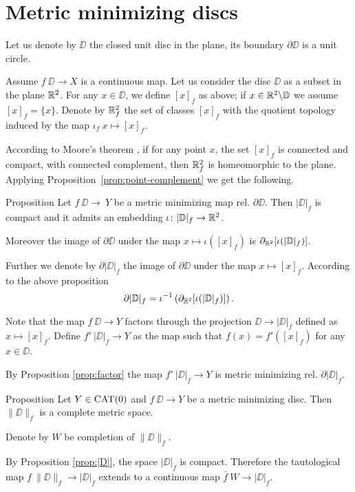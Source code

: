 \documentclass[a4paper,10pt]{amsart}
\begin{document}
\section{Metric minimizing discs}



Let us denote by $\DD$ the closed unit disc in the plane,
its boundary $\partial \DD$ is a unit circle.

Assume $f\:\DD\to X$ is a continuous map.
Let us consider the disc $\DD$ as a subset in the plane $\mathbb{R}^2$.
For any $x\in \DD$, we define $[x]_f$ as above;
if $x\in \mathbb{R}^2\backslash \mathbb{D}$ we assume $[x]_f=\{x\}$.
Denote by $\mathbb{R}^2_f$ the set of classes $[x]_f$ with the quotient topology induced by the map $\iota_f\:x\mapsto [x]_f$.

According to Moore's theorem \cite{moore},
if for any point $x$, the set $[x]_f$ is connected and compact, with connected complement,
then $\mathbb{R}^2_f$ is homeomorphic to the plane.
Applying Proposition~\ref{prop:point-complement} we get the following.

\begin{thm}{Proposition}\label{prop:|D|}
Let $f\:\DD\to\ Y$ be a metric minimizing map rel. $\partial \DD$.
Then $|\DD|_f$ is compact and it admits an embedding $\iota\colon|\mathbb{D}|_f\to \mathbb{R}^2$.

Moreover the image of $\partial \DD$
under the map $x\mapsto \iota([x]_f)$
is $\partial_{\mathbb{R}^2}[\iota(|\mathbb{D}|_f)]$.
\end{thm}

Further we denote by $\partial|\DD|_f$ the image of $\partial \DD$
under the map $x\mapsto [x]_f$.
According to the above proposition 
\[\partial|\mathbb{D}|_f=\iota^{-1}\left(\partial_{\mathbb{R}^2}[\iota(|\mathbb{D}|_f)]\right).\]

Note that the map $f\:\DD\to Y$ factors through the projection 
$\DD\to|\DD|_f$ defined as $x\mapsto[x]_f$.
Define $f'\:|\DD|_f\to Y$ as the map such that $f(x)=f'([x]_f)$ for any $x\in\DD$.

By Proposition \ref{prop:factor} the map $f'\:|\DD|_f\to Y$
is metric minimizing rel. $\partial|\DD|_f$.

\begin{thm}{Proposition}
Let $Y\in\mathop{\rm CAT}\nolimits(0)$ 
and 
$f\:\DD\to Y$ be a metric minimizing disc.
Then $\|\DD\|_f$ is a complete metric space.
\end{thm}

Denote by $W$ be completion of $\|\DD\|_f$.

By Proposition \ref{prop:|D|},
the space $|\DD|_f$ is compact.
Therefore the tautological map $f\:\|\DD\|_f\to |\DD|_f$ 
extends to a continuous map $\bar f\:W\to |\DD|_f$.
\end{document}
